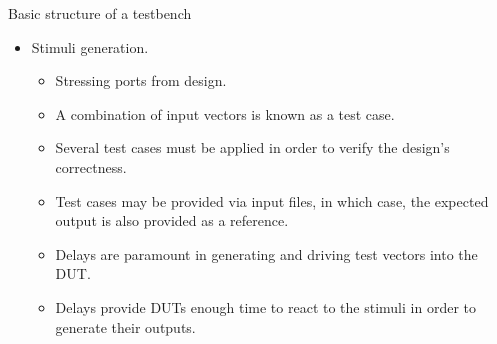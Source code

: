 %
\begin{frame}{Basic structure of a testbench}{}
\begin{itemize}
\item Stimuli generation.
\begin{itemize}
\item Stressing  ports from design.
\item A combination of input vectors is known as a test case.
\item Several test cases must be applied in order to verify the design's correctness.
\item Test cases may be provided via input files, in which case, the expected output is also provided as a reference.
\item Delays are paramount in generating and driving test vectors into the \ac{DUT}.
\item Delays provide \acp{DUT} enough time to react to the stimuli in order to generate their outputs.
\end{itemize}
\end{itemize}
\end{frame}

